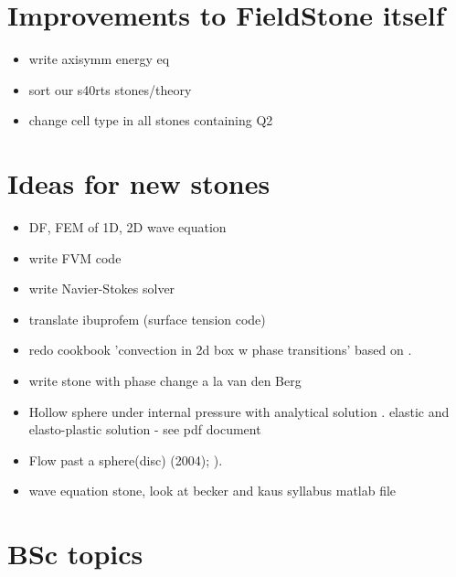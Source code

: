 \documentclass[a4paper]{article}
\begin{document}
\tableofcontents

\newpage
\section{Improvements to FieldStone itself}

\begin{itemize}
\item write axisymm energy eq 
\item sort our s40rts stones/theory
\item change cell type in all stones containing Q2
\end{itemize}

\newpage
\section{Ideas for new stones}

\begin{itemize}
\item DF, FEM of 1D, 2D wave equation
\item write FVM code
\item write Navier-Stokes solver
\item translate ibuprofem (surface tension code)
\item redo  cookbook 'convection in 2d box w phase transitions'
based on \textcite{chyu85}. 
\item write stone with phase change a la van den Berg \textcite{vava08}
\item Hollow sphere under internal pressure with analytical solution
. elastic and elasto-plastic solution  - see pdf document
\item Flow past a sphere(disc) \textcite{demj04} (2004); 
      \textcite{gafp17}). 
\item wave equation stone, look at becker and kaus syllabus matlab file
\end{itemize}

\newpage
\section{BSc topics}
\end{document}
